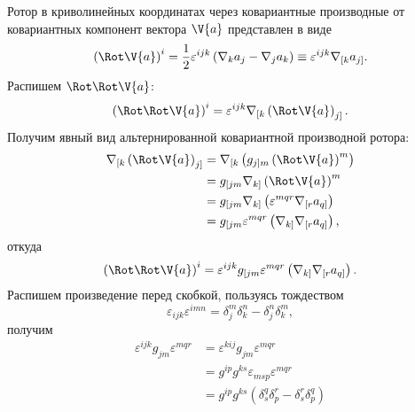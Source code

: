     Ротор в криволинейных координатах через ковариантные производные от ковариантных компонент вектора $\V{a}$ представлен в виде
    \begin{equation}
        \left( \Rot\V{a} \right)^i
            = \frac{1}{2} \varepsilon^{ijk} \left(
                \nabla_k a_j - \nabla_j a_k
            \right)
            \equiv \varepsilon^{ijk} \nabla_{[k} a_{j]}.
    \end{equation}
    Распишем $\Rot\Rot\V{a}$:
    \begin{equation}
        \left( \Rot\Rot\V{a} \right)^i
            = \varepsilon^{ijk} \nabla_{[k} \left( \Rot\V{a} \right)_{j]}.
    \end{equation}
    Получим явный вид альтернированной ковариантной производной ротора:
    \begin{equation}\begin{aligned}
        \nabla_{[k} \left( \Rot\V{a} \right)_{j]}
            &= \nabla_{[k} \left( g_{j]m} \left( \Rot\V{a} \right)^m \right) \\
            &= g_{[jm} \nabla_{k]} \left( \Rot\V{a} \right)^m \\
            &= g_{[jm} \nabla_{k]} \left(
                    \varepsilon^{mqr} \nabla_{[r} a_{q]}
            \right) \\
            &= g_{[jm} \varepsilon^{mqr} \left(
                \nabla_{k]} \nabla_{[r} a_{q]}
            \right),
    \end{aligned}\end{equation}
    откуда
    \begin{equation}
        \left( \Rot\Rot\V{a} \right)^i
            = \varepsilon^{ijk} g_{[jm} \varepsilon^{mqr} \left(
                \nabla_{k]} \nabla_{[r} a_{q]}
            \right).
    \end{equation}
    Распишем произведение перед скобкой, пользуясь тождеством
    \begin{equation}
        \varepsilon_{ijk} \varepsilon^{imn} = \delta_j^m \delta_k^n - \delta_j^n \delta_k^m,
    \end{equation}
    получим
    \begin{equation}\begin{aligned}
        \varepsilon^{ijk} g_{jm} \varepsilon^{mqr}
            &= \varepsilon^{kij} g_{jm} \varepsilon^{mqr} \\
            &= g^{ip} g^{ks} \varepsilon_{msp} \varepsilon^{mqr} \\
            &= g^{ip} g^{ks} \left(
                \delta_s^q \delta_p^r - \delta_s^r \delta_p^q
            \right)
    \end{aligned}\end{equation}
